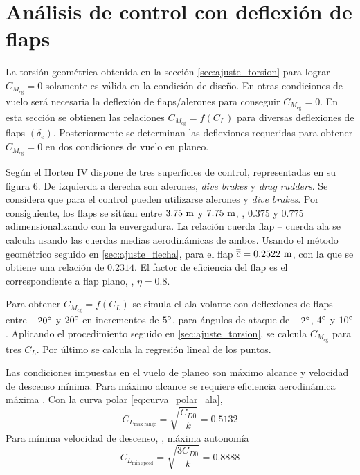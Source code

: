 
\section{Análisis de control con deflexión de flaps}

La torsión geométrica obtenida en la sección \ref{sec:ajuste_torsion} para lograr $C_{M_\text{cg}} = 0$ solamente es válida en la condición de diseño. En otras condiciones de vuelo será necesaria la deflexión de flaps/alerones para conseguir $C_{M_\text{cg}} = 0$. En esta sección se obtienen las relaciones $C_{M_\text{cg}} = f \left( C_L \right)$ para diversas deflexiones de flaps $\left( \delta_e \right)$. Posteriormente se determinan las deflexiones requeridas para obtener $C_{M_\text{cg}} = 0$ en dos condiciones de vuelo en planeo.

Según \cite{performace_hoIV} el Horten IV dispone de tres superficies de control, representadas en su figura 6. De izquierda a derecha son alerones, \emph{dive brakes} y \emph{drag rudders}. Se considera que para el control pueden utilizarse alerones y \emph{dive brakes}. Por consiguiente, los flaps se sitúan entre $3.75 \ \meter$ y $7.75 \ \meter$, \ie, $0.375$ y $0.775$ adimensionalizando con la envergadura. La relación cuerda flap -- cuerda ala se calcula usando las cuerdas medias aerodinámicas de ambos. Usando el método geométrico seguido en \ref{sec:ajuste_flecha}, para el flap $\overline{\overline{c}} = 0.2522 \ \meter$, con la que se obtiene una relación de $0.2314$. El factor de eficiencia del flap es el correspondiente a flap plano, \ie, $\eta = 0.8$.

Para obtener $C_{M_\text{cg}} = f \left( C_L \right)$ se simula el ala volante con deflexiones de flaps entre $-20\degrees$ y $20\degrees$ en incrementos de $5\degrees$, para ángulos de ataque de $-2 \degrees$, $4 \degrees$ y $10 \degrees$. Aplicando el procedimiento seguido en \ref{sec:ajuste_torsion}, se calcula $C_{M_\text{cg}}$ para tres $C_L$. Por último se calcula la regresión lineal de los puntos.

Las condiciones impuestas en el vuelo de planeo son máximo alcance y velocidad de descenso mínima. Para máximo alcance se requiere eficiencia aerodinámica máxima \cite{franchini}. Con la curva polar \eqref{eq:curva_polar_ala}, 
\begin{equation}
    C_{L_\text{max range}} = \sqrt{\frac{C_{D0}}{k}} = 0.5132
\end{equation}
Para mínima velocidad de descenso, \ie, máxima autonomía
\begin{equation}
    C_{L_\text{min speed}} = \sqrt{\frac{3 C_{D0}}{k}} = 0.8888
\end{equation}

